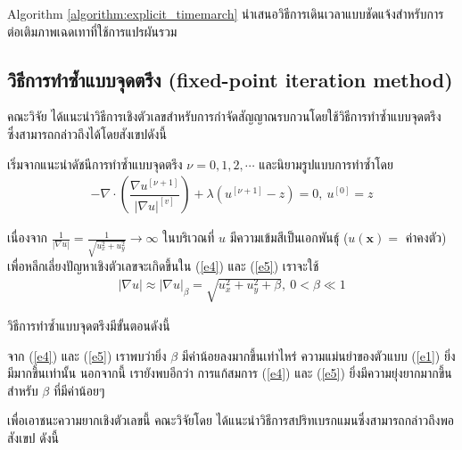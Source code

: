  \vspace{0.5cm} \hspace{1cm} Algorithm \ref{algorithm:explicit_timemarch} นำเสนอวิธีการเดินเวลาแบบชัดแจ้งสำหรับการต่อเติมภาพเฉดเทาที่ใช้การแปรผันรวม \\
 


\subsection{วิธีการทำซ้ำแบบจุดตรึง (fixed-point iteration method) }

\hspace{1cm} คณะวิจัย \cite{ref:FixpointSolver} ได้แนะนำวิธีการเชิงตัวเลขสำหรับการกำจัดสัญญาณรบกวนโดยใช้วิธีการทำซ้ำแบบจุดตรึง ซึ่งสามารถกล่าวถึงได้โดยสังเขปดังนี้
	
\hspace{1cm} เริ่มจากแนะนำดัชนีการทำซ้ำแบบจุดตรึง $\nu=0,1,2,\cdots$ และนิยามรูปแบบการทำซ้ำโดย
\begin{align}
	- \nabla\cdot\left(\dfrac{\nabla u^{[\nu+1]}}{{| \nabla u |}^{[v]} }\right) + \lambda(u^{[\nu+1]}-z)  = 0,\ u^{[0]}=z
	\label{e5}
\end{align}

\hspace{1cm} เนื่องจาก $\tfrac{1}{| \nabla u |}=\tfrac{1}{\sqrt{u_x^2+u_y^2}} \rightarrow \infty$ ในบริเวณที่ $u$ มีความเข้มสีเป็นเอกพันธ์ุ ($u(\mathbf{x})=$ ค่าคงตัว) เพื่อหลีกเลี่ยงปัญหาเชิงตัวเลขจะเกิดขึ้นใน (\ref{e4}) และ (\ref{e5}) เราจะใช้ 
\begin{align*}
|\nabla u| \approx| \nabla u |_\beta=\sqrt{u_x^2+u_y^2+\beta},\ 0< \beta \ll 1
 \end{align*}

\hspace{1cm}วิธีการทำซ้ำแบบจุดตรึงมีขั้นตอนดังนี้ \\
\vspace{0.5cm} 

\vspace{0.5cm}
\hspace{1cm} จาก (\ref{e4}) และ (\ref{e5}) เราพบว่ายิ่ง $\beta$ มีค่าน้อยลงมากขึ้นเท่าไหร่ ความแม่นยำของตัวแบบ (\ref{e1}) ยิ่งมีมากขึ้นเท่านั้น นอกจากนี้ เรายังพบอีกว่า การแก้สมการ (\ref{e4}) และ (\ref{e5}) ยิ่งมีความยุ่งยากมากขึ้นสำหรับ $\beta$ ที่มีค่าน้อยๆ 

\hspace{1cm} เพื่อเอาชนะความยากเชิงตัวเลขนี้ คณะวิจัยโดย \cite{ref:splitbergman-inpaint} ได้แนะนำวิธีการสปริทเบรกแมนซึ่งสามารถกล่าวถึงพอสังเขป ดังนี้

